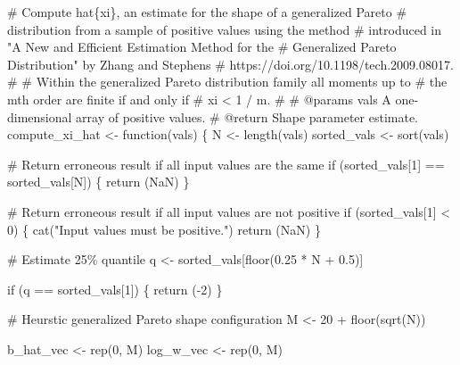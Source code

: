 \documentclass[
  letterpaper,
  DIV=11,
  numbers=noendperiod]{scrartcl}
\newenvironment{Shaded}{\begin{snugshade}}{\end{snugshade}}
\newcommand{\CommentTok}[1]{\textcolor[rgb]{0.37,0.37,0.37}{#1}}
\newcommand{\ControlFlowTok}[1]{\textcolor[rgb]{0.00,0.23,0.31}{#1}}
\newcommand{\DecValTok}[1]{\textcolor[rgb]{0.68,0.00,0.00}{#1}}
\newcommand{\FloatTok}[1]{\textcolor[rgb]{0.68,0.00,0.00}{#1}}
\newcommand{\NormalTok}[1]{\textcolor[rgb]{0.00,0.23,0.31}{#1}}
\newcommand{\OperatorTok}[1]{\textcolor[rgb]{0.37,0.37,0.37}{#1}}
\newcommand{\StringTok}[1]{\textcolor[rgb]{0.13,0.47,0.30}{#1}}
\begin{document}
\begin{Shaded}
\begin{Highlighting}[]
\CommentTok{\# Compute hat\{xi\}, an estimate for the shape of a generalized Pareto }
\CommentTok{\# distribution from a sample of positive values using the method }
\CommentTok{\# introduced in "A New and Efficient Estimation Method for the }
\CommentTok{\# Generalized Pareto Distribution" by Zhang and Stephens }
\CommentTok{\# https://doi.org/10.1198/tech.2009.08017.}
\CommentTok{\# }
\CommentTok{\# Within the generalized Pareto distribution family all moments up to }
\CommentTok{\# the mth order are finite if and only if }
\CommentTok{\#  xi \textless{} 1 / m.}
\CommentTok{\#}
\CommentTok{\# @params vals A one{-}dimensional array of positive values.}
\CommentTok{\# @return Shape parameter estimate.}
\NormalTok{compute\_xi\_hat }\OperatorTok{\textless{}{-}}\NormalTok{ function(vals) \{}
\NormalTok{  N }\OperatorTok{\textless{}{-}}\NormalTok{ length(vals)}
\NormalTok{  sorted\_vals }\OperatorTok{\textless{}{-}}\NormalTok{ sort(vals)}

  \CommentTok{\# Return erroneous result if all input values are the same }
  \ControlFlowTok{if}\NormalTok{ (sorted\_vals[}\DecValTok{1}\NormalTok{] }\OperatorTok{==}\NormalTok{ sorted\_vals[N]) \{}
    \ControlFlowTok{return}\NormalTok{ (NaN)}
\NormalTok{  \}}

  \CommentTok{\# Return erroneous result if all input values are not positive}
  \ControlFlowTok{if}\NormalTok{ (sorted\_vals[}\DecValTok{1}\NormalTok{] }\OperatorTok{\textless{}} \DecValTok{0}\NormalTok{) \{}
\NormalTok{    cat(}\StringTok{"Input values must be positive."}\NormalTok{)}
    \ControlFlowTok{return}\NormalTok{ (NaN)}
\NormalTok{  \}}

  \CommentTok{\# Estimate 25\% quantile}
\NormalTok{  q }\OperatorTok{\textless{}{-}}\NormalTok{ sorted\_vals[floor(}\FloatTok{0.25} \OperatorTok{*}\NormalTok{ N }\OperatorTok{+} \FloatTok{0.5}\NormalTok{)]}

  \ControlFlowTok{if}\NormalTok{ (q }\OperatorTok{==}\NormalTok{ sorted\_vals[}\DecValTok{1}\NormalTok{]) \{}
    \ControlFlowTok{return}\NormalTok{ (}\OperatorTok{{-}}\DecValTok{2}\NormalTok{)}
\NormalTok{  \}}

  \CommentTok{\# Heurstic generalized Pareto shape configuration}
\NormalTok{  M }\OperatorTok{\textless{}{-}} \DecValTok{20} \OperatorTok{+}\NormalTok{ floor(sqrt(N))}

\NormalTok{  b\_hat\_vec }\OperatorTok{\textless{}{-}}\NormalTok{ rep(}\DecValTok{0}\NormalTok{, M)}
\NormalTok{  log\_w\_vec }\OperatorTok{\textless{}{-}}\NormalTok{ rep(}\DecValTok{0}\NormalTok{, M)}


\end{Highlighting}
\end{Shaded}
\end{document}
